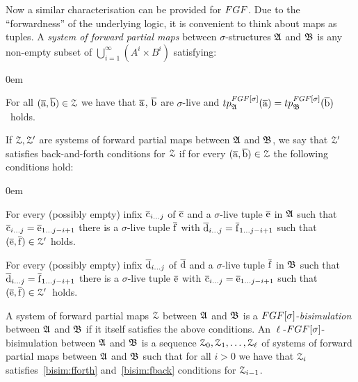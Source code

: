 Now a similar characterisation can be provided for $\FGF$. 
Due to the ``forwardness'' of the underlying logic, it is convenient to think about maps as tuples.
A \emph{system of forward partial maps} between $\sigma$-structures ${\mathfrak{A}}$ and ${\mathfrak{B}}$ is any non-empty subset of $\bigcup_{i=1}^{\infty} (A^i \times B^i)$ satisfying:
\begin{description}\itemsep0em
  \item[\desclabel{(AtomicEq)}{bisim:atomiceq}] For all $(\overline{\mathrm{a}}, \overline{\mathrm{b}}) \in \mathcal{Z}$ we have that $\overline{\mathrm{a}}$, $\overline{\mathrm{b}}$ are $\sigma$-live and $\tp{\FGF[\sigma]}{\str{A}}{\elemtuplea} = \tp{\FGF[\sigma]}{\str{B}}{\elemtupleb}$~holds.
\end{description}
If $\mathcal{Z}, \mathcal{Z}'$ are systems of forward partial maps between ${\mathfrak{A}}$ and ${\mathfrak{B}}$, we say that $\mathcal{Z}'$ satisfies back-and-forth conditions for $\mathcal{Z}$ if for every $(\overline{\mathrm{a}}, \overline{\mathrm{b}}) \in \mathcal{Z}$ the following conditions hold:
\begin{description}\itemsep0em
  \item[\desclabel{(fForth)}{bisim:fforth}] For every (possibly empty) infix $\overline{\mathrm{c}}_{i\ldots j}$ of $\overline{\mathrm{c}}$ and a $\sigma$-live tuple $\overline{\mathrm{e}}$ in ${\mathfrak{A}}$ such that $\overline{\mathrm{c}}_{i\ldots j} = \overline{\mathrm{e}}_{1\ldots j{-}i{+}1}$ there is a $\sigma$-live tuple $\overline{\mathrm{f}}$ with $\overline{\mathrm{d}}_{i\ldots j} = {\overline{\mathrm{f}}}_{1\dots j{-}i{+}1}$ such that $(\overline{\mathrm{e}}, \overline{\mathrm{f}}) \in \mathcal{Z}'$ holds.
  \item[\desclabel{(fBack)}{bisim:fback}] For every (possibly empty) infix $\overline{\mathrm{d}}_{i\ldots j}$ of $\overline{\mathrm{d}}$ and a $\sigma$-live tuple $\overline{\mathrm{f}}$ in ${\mathfrak{B}}$ such that $\overline{\mathrm{d}}_{i\ldots j} = {\overline{\mathrm{f}}}_{1\dots j{-}i{+}1}$ there is a $\sigma$-live tuple $\overline{\mathrm{e}}$ with $\overline{\mathrm{c}}_{i\ldots j} = \overline{\mathrm{e}}_{1\ldots j{-}i{+}1}$ such that $(\overline{\mathrm{e}}, \overline{\mathrm{f}}) \in \mathcal{Z}'$~holds.
\end{description}
A system of forward partial maps $\mathcal{Z}$ between ${\mathfrak{A}}$ and ${\mathfrak{B}}$ is a $\FGF[\sigma]$-\emph{bisimulation} between ${\mathfrak{A}}$ and ${\mathfrak{B}}$ if it itself satisfies the above conditions.
An $\ell$-$\FGF[\sigma]$-bisimulation between ${\mathfrak{A}}$ and ${\mathfrak{B}}$ is a sequence $\mathcal{Z}_0, \mathcal{Z}_1, \ldots, \mathcal{Z}_\ell$ of systems of forward partial maps between ${\mathfrak{A}}$ and ${\mathfrak{B}}$ such that for all $i > 0$ we have that $\mathcal{Z}_i$ satisfies~\ref{bisim:fforth} and~\ref{bisim:fback} conditions for $\mathcal{Z}_{i{-}1}$.
